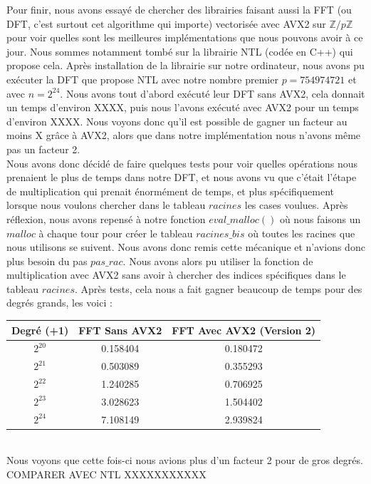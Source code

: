 \documentclass[12pt, a4paper]{article}
\begin{document}
Pour finir, nous avons essayé de chercher des librairies faisant aussi la FFT (ou DFT, c'est surtout cet algorithme qui importe) vectorisée avec AVX2 sur $\mathbb{Z}/p\mathbb{Z}$ pour voir quelles sont les meilleures implémentations que nous pouvons avoir à ce jour. Nous sommes notamment tombé sur la librairie NTL (codée en C++) qui propose cela. Après installation de la librairie sur notre ordinateur, nous avons pu exécuter la DFT que propose NTL avec notre nombre premier $p = 754974721$ et avec $n = 2^{24}$. Nous avons tout d'abord exécuté leur DFT sans AVX2, cela donnait un temps d'environ XXXX, puis nous l'avons exécuté avec AVX2 pour un temps d'environ XXXX. Nous voyons donc qu'il est possible de gagner un facteur au moins X grâce à AVX2, alors que dans notre implémentation nous n'avons même pas un facteur 2. \\
\indent Nous avons donc décidé de faire quelques tests pour voir quelles opérations nous prenaient le plus de temps dans notre DFT, et nous avons vu que c'était l'étape de multiplication qui prenait énormément de temps, et plus spécifiquement lorsque nous voulons chercher dans le tableau $racines$ les cases voulues. Après réflexion, nous avons repensé à notre fonction $eval\_malloc()$ où nous faisons un $malloc$ à chaque tour pour créer le tableau $racines\_bis$ où toutes les racines que nous utilisons se suivent. Nous avons donc remis cette mécanique et n'avions donc plus besoin du pas $pas\_rac$. Nous avons alors pu utiliser la fonction de multiplication avec AVX2 sans avoir à chercher des indices spécifiques dans le tableau $racines$. 
\newpage
Après tests, cela nous a fait gagner beaucoup de temps pour des degrés grands, les voici : 

\begin{center}
\begin{tabular}{||c c c||}
\hline
Degré (+1) & FFT Sans AVX2 & FFT Avec AVX2 (Version 2) \\
\hline\hline
$2^{20}$ & 0.158404 & 0.180472 \\
\hline
$2^{21}$ & 0.503089 & 0.355293 \\
\hline
$2^{22}$ & 1.240285 & 0.706925 \\
\hline
$2^{23}$ & 3.028623 & 1.504402 \\
\hline
$2^{24}$ & 7.108149 & 2.939824 \\
\hline
\end{tabular}
\end{center}
{}
\ \\
\indent Nous voyons que cette fois-ci nous avions plus d'un facteur 2 pour de gros degrés. COMPARER AVEC NTL XXXXXXXXXXX
\end{document}
